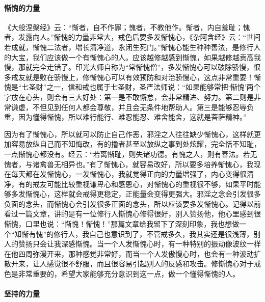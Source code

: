 \paragraph{惭愧的力量}

《大般涅槃经》云：“惭者，自不作罪；愧者，不教他作。惭者，内自羞耻；愧者，发露向人。”惭愧的力量非常大，戒色后要多发惭愧心，《杂阿含经》云：“世间若成就，惭愧二法者，增长清净道，永闭生死门。”惭愧心能生种种善法，是修行人的大宝，我们应该做一个有惭愧心的人。应该越修越感到惭愧，如果越修越贡高我慢，那就完全走错了。印光大师自称为“常惭愧僧”，多发惭愧心可以破除骄慢，很多戒友就是败在骄慢上，修惭愧心可以有效预防和对治骄慢心，这点非常重要！惭愧是“七圣财”之一，信和戒也属于七圣财，圣严法师说：“如果能够常把‘惭愧’两个字放在心头，则会有三大好处：第一是不敢懈怠，会非常精进、努力。第二则是非常谦虚，不但见到任何人都会尊敬，并且会无条件地帮助人。第三是能够忍辱负重，因为懂得惭愧，所以难行能行、难忍能忍、难舍能舍，这就是菩萨精神。”

因为有了惭愧心，所以就可以防止自己作恶，邪淫之人往往缺少惭愧心，这样就更加容易放纵自己而不知悔改，有的撸者甚至以放纵之事到处炫耀，完全恬不知耻，一点惭愧心都没有。经云：“若离惭耻，则失诸功德。有愧之人，则有善法。若无愧者，与诸禽兽无相异也。”有了惭愧心，就容易改好，所以要多培养惭愧心，我现在每天都在发惭愧心，一发惭愧心，我就觉得正向的力量增强了，内心变得很清净，有的戒友可能比较重视谦卑心和感恩心，对惭愧心的重视很不够，如果平时能够多发惭愧心，这样就会戒得更稳定，正能量会变得更强大。邪淫之念会引发很多负面的念头，而惭愧心会引发很多正面的念头，所以应该要多发惭愧心。记得以前看过一篇文章，讲的是有一位修行人惭愧心修得很好，别人赞扬他，他心里感到很惭愧，口里也说：“惭愧！惭愧！”那篇文章给我留下了深刻印象，我也想做一个“知惭有愧”的修行人，我自己也意识到了，不管戒多久，我其实还是很浅薄，别人的赞扬只会让我深感惭愧。当一个人发惭愧心时，有一种特别的振动像波纹一样在他四周弥漫开来，那种感觉非常好，而当一个人发傲慢心时，也会有一种波动扩散开来，让人感觉很不舒服，而且很容易引起别人的反感和攻击。修惭愧心对于戒色是非常重要的，希望大家能够充分意识到这一点，做一个懂得惭愧的人。

\paragraph{坚持的力量}

